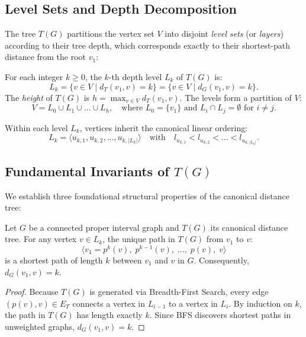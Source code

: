 \subsection{Level Sets and Depth Decomposition}

The tree $T(G)$ partitions the vertex set $V$ into disjoint \emph{level sets} (or \emph{layers}) according to their tree depth, which corresponds exactly to their shortest-path distance from the root $v_1$:
\begin{definition}
For each integer $k \ge 0$, the $k$-th depth level $L_k$ of $T(G)$ is:
\begin{equation}
    L_k = \{ v \in V \mid d_T(v_1, v) = k \} = \{ v \in V \mid d_G(v_1, v) = k \}.
\end{equation}
The \emph{height} of $T(G)$ is $h = \max_{v \in V} d_T(v_1, v)$. The levels form a partition of $V$:
\begin{equation}
    V = L_0 \cup L_1 \cup \dots \cup L_h, \quad \text{where } L_0 = \{v_1\} \text{ and } L_i \cap L_j = \emptyset \text{ for } i \ne j.
\end{equation}
\end{definition}

Within each level $L_k$, vertices inherit the canonical linear ordering:
\begin{equation}
    L_k = \langle u_{k,1}, u_{k,2}, \dots, u_{k,|L_k|} \rangle \quad \text{with} \quad l_{u_{k,1}} < l_{u_{k,2}} < \dots < l_{u_{k,|L_k|}}.
\end{equation}

\subsection{Fundamental Invariants of $T(G)$}

We establish three foundational structural properties of the canonical distance tree:

\begin{lemma}
\label{lem:distance_encoding}
Let $G$ be a connected proper interval graph and $T(G)$ its canonical distance tree. For any vertex $v \in L_k$, the unique path in $T(G)$ from $v_1$ to $v$:
\begin{equation}
    \langle v_1 = p^k(v), \; p^{k-1}(v), \; \dots, \; p(v), \; v \rangle
\end{equation}
is a shortest path of length $k$ between $v_1$ and $v$ in $G$. Consequently, $d_G(v_1, v) = k$.
\end{lemma}
\begin{proof}
Because $T(G)$ is generated via Breadth-First Search, every edge $(p(v), v) \in E_T$ connects a vertex in $L_{i-1}$ to a vertex in $L_i$. By induction on $k$, the path in $T(G)$ has length exactly $k$. Since BFS discovers shortest paths in unweighted graphs, $d_G(v_1, v) = k$.
\end{proof}

